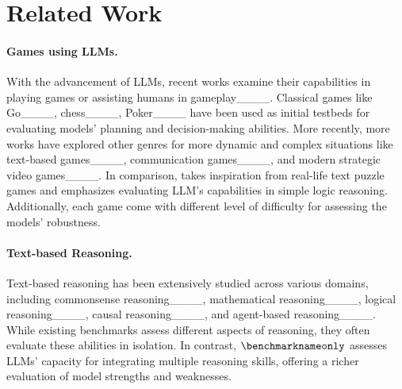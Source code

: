 \section{Related Work}
\paragraph{Games using LLMs.} With the advancement of LLMs, recent works examine their capabilities in playing games or assisting humans in gameplay____. Classical games like Go____, chess____, Poker____ have been used as initial testbeds for evaluating models' planning and decision-making abilities. More recently, more works have explored other genres for more dynamic and complex situations like text-based games____, communication games____, and modern strategic video games____. 
In comparison, \benchmarknameonly{} takes inspiration from real-life text puzzle games and emphasizes evaluating LLM's capabilities in simple logic reasoning. Additionally, each game come with different level of difficulty for assessing the models' robustness.

\paragraph{Text-based Reasoning.} Text-based reasoning has been extensively studied across various domains, including commonsense reasoning____, mathematical reasoning____, logical reasoning____, causal reasoning____, and agent-based reasoning____. While existing benchmarks assess different aspects of reasoning, they often evaluate these abilities in isolation. In contrast, $\benchmarknameonly$ assesses LLMs' capacity for integrating multiple reasoning skills, offering a richer evaluation of model strengths and weaknesses.
~